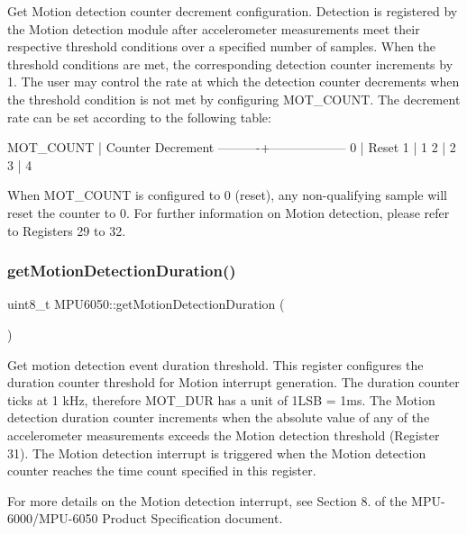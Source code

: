 Get Motion detection counter decrement configuration. Detection is registered by the Motion detection module after accelerometer measurements meet their respective threshold conditions over a specified number of samples. When the threshold conditions are met, the corresponding detection counter increments by 1. The user may control the rate at which the detection counter decrements when the threshold condition is not met by configuring M\+O\+T\+\_\+\+C\+O\+U\+NT. The decrement rate can be set according to the following table\+:


\begin{DoxyPre}
MOT\_COUNT | Counter Decrement
----------+------------------
0         | Reset
1         | 1
2         | 2
3         | 4
\end{DoxyPre}


When M\+O\+T\+\_\+\+C\+O\+U\+NT is configured to 0 (reset), any non-\/qualifying sample will reset the counter to 0. For further information on Motion detection, please refer to Registers 29 to 32. \mbox{\label{class_m_p_u6050_a8ba035c2ae4a05d7e51b0d29e4924fb0}} 
\subsubsection{\texorpdfstring{getMotionDetectionDuration()}{getMotionDetectionDuration()}}
{\footnotesize\ttfamily uint8\+\_\+t M\+P\+U6050\+::get\+Motion\+Detection\+Duration (\begin{DoxyParamCaption}{ }\end{DoxyParamCaption})}

Get motion detection event duration threshold. This register configures the duration counter threshold for Motion interrupt generation. The duration counter ticks at 1 k\+Hz, therefore M\+O\+T\+\_\+\+D\+UR has a unit of 1L\+SB = 1ms. The Motion detection duration counter increments when the absolute value of any of the accelerometer measurements exceeds the Motion detection threshold (Register 31). The Motion detection interrupt is triggered when the Motion detection counter reaches the time count specified in this register.

For more details on the Motion detection interrupt, see Section 8. of the M\+P\+U-\/6000/\+M\+P\+U-\/6050 Product Specification document.

